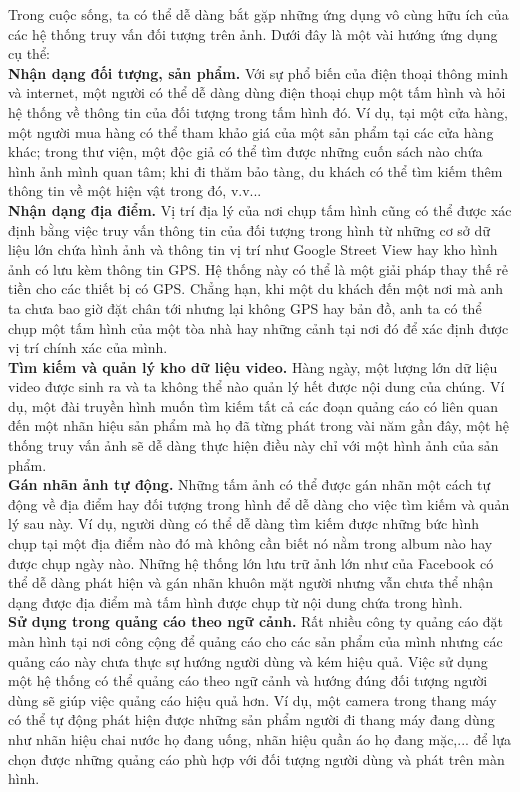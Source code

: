 Trong cuộc sống, ta có thể dễ dàng bắt gặp những ứng dụng vô cùng hữu ích của các hệ thống truy vấn đối tượng trên ảnh. Dưới đây là một vài hướng ứng dụng cụ thể:\\
\textbf{Nhận dạng đối tượng, sản phẩm.} Với sự phổ biến của điện thoại thông minh và internet, một người có thể dễ dàng dùng điện thoại chụp một tấm hình và hỏi hệ thống về thông tin của đối tượng trong tấm hình đó. Ví dụ, tại một cửa hàng, một người mua hàng có thể tham khảo giá của một sản phẩm tại các cửa hàng khác; trong thư viện, một độc giả có thể tìm được những cuốn sách nào chứa hình ảnh mình quan tâm; khi đi thăm bảo tàng, du khách có thể tìm kiếm thêm thông tin về một hiện vật trong đó, v.v...\\
\textbf{Nhận dạng địa điểm.} Vị trí địa lý của nơi chụp tấm hình cũng có thể được xác định bằng việc truy vấn thông tin của đối tượng trong hình từ những cơ sở dữ liệu lớn chứa hình ảnh và thông tin vị trí như Google Street View hay kho hình ảnh có lưu kèm thông tin GPS. Hệ thống này có thể là một giải pháp thay thế rẻ tiền cho các thiết bị có GPS. Chẳng hạn, khi một du khách đến một nơi mà anh ta chưa bao giờ đặt chân tới nhưng lại không GPS hay bản đồ, anh ta có thể chụp một tấm hình của một tòa nhà hay những cảnh tại nơi đó để xác định được vị trí chính xác của mình.\\
\textbf{Tìm kiếm và quản lý kho dữ liệu video.} Hàng ngày, một lượng lớn dữ liệu video được sinh ra và ta không thể nào quản lý hết được nội dung của chúng. Ví dụ, một đài truyền hình muốn tìm kiếm tất cả các đoạn quảng cáo có liên quan đến một nhãn hiệu sản phẩm mà họ đã từng phát trong vài năm gần đây, một hệ thống truy vấn ảnh sẽ dễ dàng thực hiện điều này chỉ với một hình ảnh của sản phẩm.\\
\textbf{Gán nhãn ảnh tự động.} Những tấm ảnh có thể được gán nhãn một cách tự động về địa điểm hay đối tượng trong hình để dễ dàng cho việc tìm kiếm và quản lý sau này. Ví dụ, người dùng có thể dễ dàng tìm kiếm được những bức hình chụp tại một địa điểm nào đó mà không cần biết nó nằm trong album nào hay được chụp ngày nào. Những hệ thống lớn lưu trữ ảnh lớn như của Facebook có thể dễ dàng phát hiện và gán nhãn khuôn mặt người nhưng vẫn chưa thể nhận dạng được địa điểm mà tấm hình được chụp từ nội dung chứa trong hình.\\
\textbf{Sử dụng trong quảng cáo theo ngữ cảnh.} Rất nhiều công ty quảng cáo đặt màn hình tại nơi công cộng để quảng cáo cho các sản phẩm của mình nhưng các quảng cáo này chưa thực sự hướng người dùng và kém hiệu quả. Việc sử dụng một hệ thống có thể quảng cáo theo ngữ cảnh và hướng đúng đối tượng người dùng sẽ giúp việc quảng cáo hiệu quả hơn. Ví dụ, một camera trong thang máy có thể tự động phát hiện được những sản phẩm người đi thang máy đang dùng như nhãn hiệu chai nước họ đang uống, nhãn hiệu quần áo họ đang mặc,... để lựa chọn được những quảng cáo phù hợp với đối tượng người dùng và phát trên màn hình.\\
